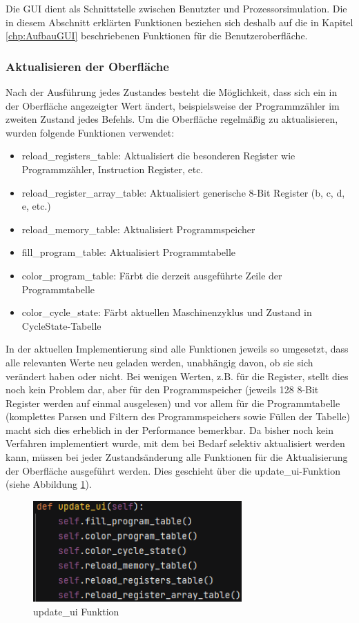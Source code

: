\documentclass[12pt]{article}
\newcommand{\imgSpaceBefore}{\vspace{10pt}}
\begin{document}
\noindent
Die GUI dient als Schnittstelle zwischen Benutzter und Prozessorsimulation. Die in diesem Abschnitt erklärten Funktionen beziehen sich deshalb auf die in Kapitel \ref{chp:AufbauGUI} beschriebenen Funktionen für die Benutzeroberfläche.

\subsubsection{Aktualisieren der Oberfläche}
Nach der Ausführung jedes Zustandes besteht die Möglichkeit, dass sich ein in der Oberfläche angezeigter Wert ändert, beispielsweise der Programmzähler im zweiten Zustand jedes Befehls. Um die Oberfläche regelmäßig zu aktualisieren, wurden folgende Funktionen verwendet:\imgSpaceBefore

\begin{itemize}
	\item reload\_registers\_table: Aktualisiert die besonderen Register wie Programmzähler, Instruction Register, etc.
	\item reload\_register\_array\_table: Aktualisiert generische 8-Bit Register (b, c, d, e, etc.)
	\item reload\_memory\_table: Aktualisiert Programmspeicher
	\item fill\_program\_table: Aktualisiert Programmtabelle
	\item color\_program\_table: Färbt die derzeit ausgeführte Zeile der Programmtabelle
	\item color\_cycle\_state: Färbt aktuellen Maschinenzyklus und Zustand in CycleState-Tabelle
\end{itemize}
\noindent
In der aktuellen Implementierung sind alle Funktionen jeweils so umgesetzt, dass alle relevanten Werte neu geladen werden, unabhängig davon, ob sie sich verändert haben oder nicht. Bei wenigen Werten, z.B. für die Register, stellt dies noch kein Problem dar, aber für den Programmspeicher (jeweils 128 8-Bit Register werden auf einmal ausgelesen) und vor allem für die Programmtabelle (komplettes Parsen und Filtern des Programmspeichers sowie Füllen der Tabelle) macht sich dies erheblich in der Performance bemerkbar. Da bisher noch kein Verfahren implementiert wurde, mit dem bei Bedarf selektiv aktualisiert werden kann, müssen bei jeder Zustandsänderung alle Funktionen für die Aktualisierung der Oberfläche ausgeführt werden. Dies geschieht über die \glqq update\_ui\grqq-Funktion (siehe Abbildung \ref{fig:updateUI}).\imgSpaceBefore

\begin{figure}[H]
\centering
\includegraphics[width=8cm]{bilder/updateUI}
\caption{update\_ui Funktion}
\label{fig:updateUI}
\end{figure}
\end{document}
